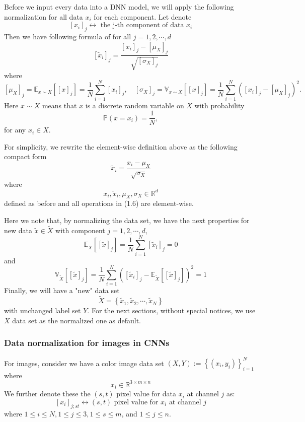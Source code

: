 \documentclass[10pt]{article}
\begin{document}
Before we input every data into a DNN model, we will apply the following normalization for all data $x_{i}$ for each component. Let denote
$$
\left[x_{i}\right]_{j} \longleftrightarrow \text { the } \mathrm{j} \text {-th component of data } x_{i}
$$
Then we have following formula of for all $j=1,2, \cdots, d$
$$
\left[\tilde{x}_{i}\right]_{j}=\frac{\left[x_{i}\right]_{j}-\left[\mu_{X}\right]_{j}}{\sqrt{\left[\sigma_{X}\right]_{j}}}
$$
where
$$
\left[\mu_{X}\right]_{j}=\mathbb{E}_{x \sim X}\left[[x]_{j}\right]=\frac{1}{N} \sum_{i=1}^{N}\left[x_{i}\right]_{j}, \quad\left[\sigma_{X}\right]_{j}=\mathbb{V}_{x \sim X}\left[[x]_{j}\right]=\frac{1}{N} \sum_{i=1}^{N}\left(\left[x_{i}\right]_{j}-\left[\mu_{X}\right]_{j}\right)^{2} .
$$
Here $x \sim X$ means that $x$ is a discrete random variable on $X$ with probability
$$
\mathbb{P}\left(x=x_{i}\right)=\frac{1}{N},
$$
for any $x_{i} \in X$.

For simplicity, we rewrite the element-wise definition above as the following compact form
$$
\tilde{x}_{i}=\frac{x_{i}-\mu_{X}}{\sqrt{\sigma_{X}}}
$$
where
$$
x_{i}, \tilde{x}_{i}, \mu_{X}, \sigma_{X} \in \mathbb{R}^{d}
$$
defined as before and all operations in (1.6) are element-wise.

Here we note that, by normalizing the data set, we have the next properties for new data $\tilde{x} \in \tilde{X}$ with component $j=1,2, \cdots, d$,
$$
\mathbb{E}_{\bar{X}}\left[[\tilde{x}]_{j}\right]=\frac{1}{N} \sum_{i=1}^{N}\left[\tilde{x}_{i}\right]_{j}=0
$$
and
$$
\mathbb{V}_{\tilde{X}}\left[[\tilde{x}]_{j}\right]=\frac{1}{N} \sum_{i=1}^{N}\left(\left[\tilde{x}_{i}\right]_{j}-\mathbb{E}_{\tilde{X}}\left[[\tilde{x}]_{j}\right]\right)^{2}=1
$$
Finally, we will have a "new" data set
$$
\tilde{X}=\left\{\tilde{x}_{1}, \tilde{x}_{2}, \cdots, \tilde{x}_{N}\right\}
$$
with unchanged label set $Y$. For the next sections, without special notices, we use $X$ data set as the normalized one as default.

\subsubsection{Data normalization for images in CNNs}
For images, consider we have a color image data set $(X, Y):=\left\{\left(x_{i}, y_{i}\right)\right\}_{i=1}^{N}$ where
$$
x_{i} \in \mathbb{R}^{3 \times m \times n}
$$
We further denote these the $(s, t)$ pixel value for data $x_{i}$ at channel $j$ as:
$$
\left[x_{i}\right]_{j ; s t} \longleftrightarrow(s, t) \text { pixel value for } x_{i} \text { at channel } j
$$
where $1 \leq i \leq N, 1 \leq j \leq 3,1 \leq s \leq m$, and $1 \leq j \leq n .$
\end{document}
